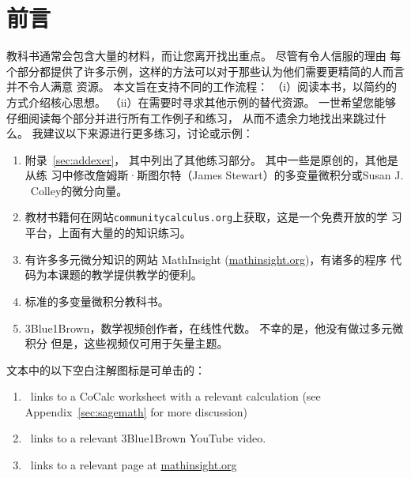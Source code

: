 \documentclass[indent]{watsonbook}
\begin{document}

\newpage
\pagecolor{white}
\hphantom{a} \thispagestyle{empty}
\newpage

\chapter*{前\quad 言} \thispagestyle{empty}

教科书通常会包含大量的材料，而让您离开找出重点。 尽管有令人信服的理由
每个部分都提供了许多示例，这样的方法可以对于那些认为他们需要更精简的人而言并不令人满意
资源。 本文旨在支持不同的工作流程：
（i）阅读本书，以简约的方式介绍核心思想。
（ii）在需要时寻求其他示例的替代资源。 一世希望您能够仔细阅读每个部分并进行所有工作例子和练习，
从而不遗余力地找出来跳过什么。 我建议以下来源进行更多练习，讨论或示例：



\begin{enumerate}[itemsep = 3pt]
\item 附录~\ref{sec:addexer}， 其中列出了其他练习部分。 其中一些是原创的，其他是从练
习中修改詹姆斯·斯图尔特（James Stewart）的多变量微积分或Susan J. \ Colley的微分向量。

\item 教材书籍何在网站\texttt{communitycalculus.org}上获取，这是一个免费开放的学
习平台，上面有大量的的知识练习。
\item  有许多多元微分知识的网站 MathInsight (\url{mathinsight.org})，有诸多的程序
代码为本课题的教学提供教学的便利。
\item 标准的多变量微积分教科书。
\item 3Blue1Brown，数学视频创作者，在线性代数。 不幸的是，他没有做过多元微积分
   但是，这些视频仅可用于矢量主题。
\end{enumerate}

文本中的以下空白注解图标是可单击的：
\begin{enumerate}[itemsep=6pt, topsep = -6pt]
\item \href{http://cocalc.com}{\cocalc}\,
  links to a CoCalc worksheet with a relevant calculation (see Appendix~\ref{sec:sagemath} for more
  discussion)
\item \href{http://3blue1brown.com}{\tbob} \, links to a relevant 3Blue1Brown YouTube video.
\item \href{http://mathinsight.org}{\mi} \, links to a relevant page at \url{mathinsight.org}
\end{enumerate}

\vspace{6pt}
\end{document}
